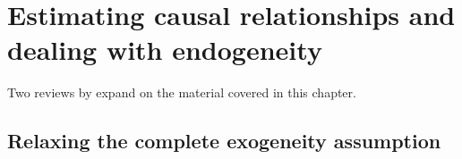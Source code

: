 

\chapter{Estimating causal relationships and dealing with endogeneity}

Two reviews by \citet{IW07,IW09} expand on the material covered in
this chapter.

\section{Relaxing the complete exogeneity assumption}

